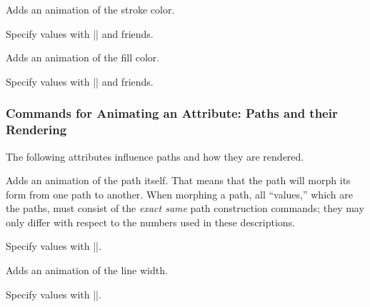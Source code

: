 \begin{command}{\pgfsys@animatestrokecolor}
  Adds an animation of the stroke color.

  Specify values with |\pgfsys@animation@color@rgb| and friends.
\begin{codeexample}[width=2cm]
\end{codeexample}
\end{command}

\begin{command}{\pgfsys@animatefillcolor}
  Adds an animation of the fill color.
  
  Specify values with |\pgfsys@animation@color@rgb| and friends.
\begin{codeexample}[width=2cm]
\end{codeexample}
\end{command}


\subsubsection{Commands for Animating an Attribute: Paths and their Rendering}

The following attributes influence paths and how they are rendered.

\begin{command}{\pgfsys@animatepath}
  Adds an animation of the path itself. That means that the path will
  morph its form from one path to another. When morphing a path, all
  ``values,'' which are the paths, must consist of the  \emph{exact
    same} path construction commands; they may only differ with
  respect to the numbers used in these descriptions.
  
  Specify values with |\pgfsys@animation@path|.
\begin{codeexample}[width=2.3cm]
\end{codeexample}
\end{command}

\begin{command}{\pgfsys@animatelinewidth}
  Adds an animation of the line width.
  
  Specify values with |\pgfsys@animation@dimension|.
\begin{codeexample}[width=2cm]
\end{codeexample}
\end{command}


